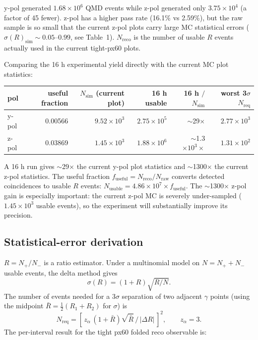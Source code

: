 \documentclass[a4paper,11pt]{article}
\begin{document}
y-pol generated $1.68\times10^6$ QMD events while z-pol generated only $3.75\times10^4$ (a factor of 45 fewer). z-pol has a higher pass rate (16.1\% vs 2.59\%), but the raw sample is so small that the current z-pol plots carry large MC statistical errors ($\sigma(R)_{\mathrm{sim}}\sim0.05$--$0.99$, see Table~1). $N_{\mathrm{reco}}$ is the number of usable $R$ events actually used in the current tight-px60 plots.

Comparing the 16 h experimental yield directly with the current MC plot statistics:

\begin{table}[H]
\centering
\begin{tabular}{lrrrrr}
\toprule
pol & useful fraction & $N_{\mathrm{sim}}$ (current plot) & 16 h usable & 16 h $/$ $N_{\mathrm{sim}}$ & worst 3$\sigma$ $N_{\mathrm{req}}$ \\
\midrule
y-pol & 0.00566 & $9.52\times10^3$ & $2.75\times10^5$ & $\sim$29$\times$ & $2.77\times10^3$ \\
z-pol & 0.03869 & $1.45\times10^3$ & $1.88\times10^6$ & $\sim$1.3$\times10^3\times$ & $1.31\times10^2$ \\
\bottomrule
\end{tabular}
\end{table}

A 16 h run gives $\sim$29$\times$ the current y-pol plot statistics and $\sim$1300$\times$ the current z-pol statistics. The useful fraction $f_{\mathrm{useful}}=N_{\mathrm{reco}}/N_{\mathrm{raw}}$ converts detected coincidences to usable $R$ events: $N_{\mathrm{usable}}=4.86\times10^7\times f_{\mathrm{useful}}$. The $\sim$1300$\times$ z-pol gain is especially important: the current z-pol MC is severely under-sampled ($1.45\times10^3$ usable events), so the experiment will substantially improve its precision.

\subsection{Statistical-error derivation}

$R=N_{+}/N_{-}$ is a ratio estimator. Under a multinomial model on $N=N_{+}+N_{-}$ usable events, the delta method gives
\[
  \sigma(R) = (1+R)\sqrt{R/N}.
\]
The number of events needed for a 3$\sigma$ separation of two adjacent $\gamma$ points (using the midpoint $\bar R=\tfrac12(R_1+R_2)$ for $\sigma$) is
\[
  N_{\mathrm{req}} = \left[\, z_\alpha\,(1+\bar R)\sqrt{\bar R}\,/\,|\Delta R|\,\right]^2, \qquad z_\alpha=3.
\]
The per-interval result for the tight px60 folded reco observable is:
\end{document}
